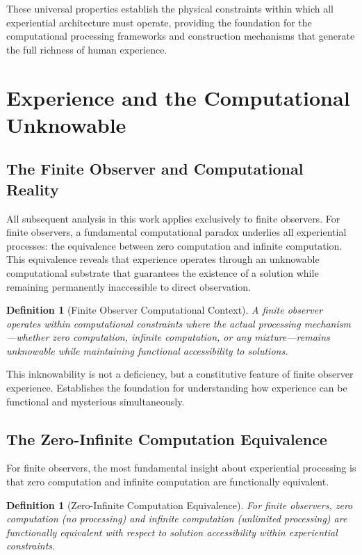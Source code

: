 \documentclass{article}
\newtheorem{definition}[theorem]{Definition}
\begin{document}
These universal properties establish the physical constraints within which all experiential architecture must operate, providing the foundation for the computational processing frameworks and construction mechanisms that generate the full richness of human experience.

\section{Experience and the Computational Unknowable}

\subsection{The Finite Observer and Computational Reality}

All subsequent analysis in this work applies exclusively to finite observers. For finite observers, a fundamental computational paradox underlies all experiential processes: the equivalence between zero computation and infinite computation. This equivalence reveals that experience operates through an unknowable computational substrate that guarantees the existence of a solution while remaining permanently inaccessible to direct observation.

\begin{definition}[Finite Observer Computational Context]
A finite observer operates within computational constraints where the actual processing mechanism—whether zero computation, infinite computation, or any mixture—remains unknowable while maintaining functional accessibility to solutions.
\end{definition}

This inknowability is not a deficiency, but a constitutive feature of finite observer experience. Establishes the foundation for understanding how experience can be functional and mysterious simultaneously.

\subsection{The Zero-Infinite Computation Equivalence}

For finite observers, the most fundamental insight about experiential processing is that zero computation and infinite computation are functionally equivalent.

\begin{definition}[Zero-Infinite Computation Equivalence]
For finite observers, zero computation (no processing) and infinite computation (unlimited processing) are functionally equivalent with respect to solution accessibility within experiential constraints.
\end{definition}
\end{document}
